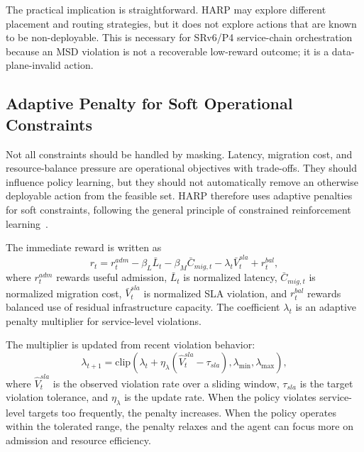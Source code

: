 \documentclass[final,5p]{elsarticle}
\begin{document}
The practical implication is straightforward. HARP may explore different placement and routing strategies, but it does not explore actions that are known to be non-deployable. This is necessary for SRv6/P4 service-chain orchestration because an MSD violation is not a recoverable low-reward outcome; it is a data-plane-invalid action.

\subsection{Adaptive Penalty for Soft Operational Constraints}
\label{subsec:harp_penalty}

Not all constraints should be handled by masking. Latency, migration cost, and resource-balance pressure are operational objectives with trade-offs. They should influence policy learning, but they should not automatically remove an otherwise deployable action from the feasible set. HARP therefore uses adaptive penalties for soft constraints, following the general principle of constrained reinforcement learning~\cite{gu2024safe,ma2022conservative}.

The immediate reward is written as
\begin{equation}
    r_t =
    r_t^{adm}
    - \beta_L \bar{L}_t
    - \beta_M \bar{C}_{mig,t}
    - \lambda_t \bar{V}^{sla}_t
    + r_t^{bal},
    \label{eq:harp_reward}
\end{equation}
where \(r_t^{adm}\) rewards useful admission, \(\bar{L}_t\) is normalized latency, \(\bar{C}_{mig,t}\) is normalized migration cost, \(\bar{V}^{sla}_t\) is normalized SLA violation, and \(r_t^{bal}\) rewards balanced use of residual infrastructure capacity. The coefficient \(\lambda_t\) is an adaptive penalty multiplier for service-level violations.

The multiplier is updated from recent violation behavior:
\begin{equation}
    \lambda_{t+1}
    =
    \mathrm{clip}
    \left(
        \lambda_t
        +
        \eta_{\lambda}
        \left(
            \hat{V}^{sla}_t - \tau_{sla}
        \right),
        \lambda_{\min},
        \lambda_{\max}
    \right),
    \label{eq:lambda_update}
\end{equation}
where \(\hat{V}^{sla}_t\) is the observed violation rate over a sliding window, \(\tau_{sla}\) is the target violation tolerance, and \(\eta_{\lambda}\) is the update rate. When the policy violates service-level targets too frequently, the penalty increases. When the policy operates within the tolerated range, the penalty relaxes and the agent can focus more on admission and resource efficiency.
\end{document}
